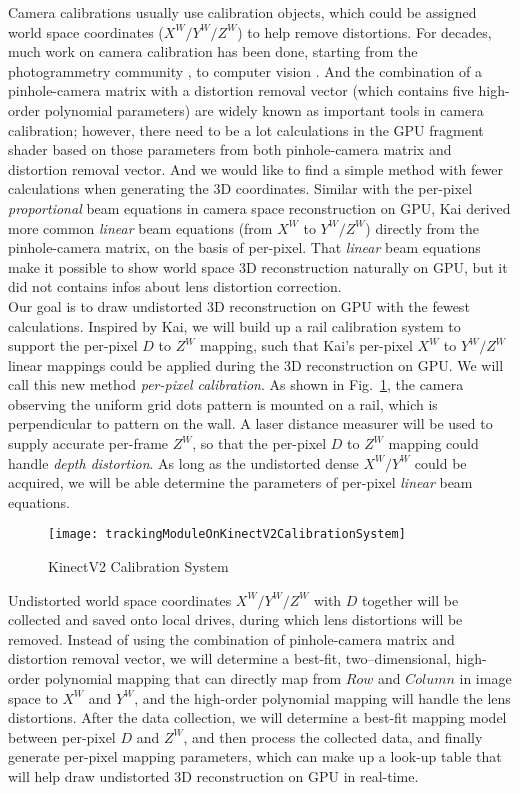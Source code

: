 Camera calibrations usually use calibration objects, which could be assigned world space coordinates (\(X^W/Y^W/Z^W\)) to help remove distortions. For decades, much work on camera calibration has been done, starting from the photogrammetry community \cite{photogrammetry01_1971, photogrammetry02_1975}, to computer vision \cite{Tsai1987, treeDcalibration1_1993, Zhengyou04}. And the combination of a pinhole-camera matrix with a distortion removal vector (which contains five high-order polynomial parameters) are widely known as important tools in camera calibration; however, there need to be a lot calculations in the GPU fragment shader based on those parameters from both pinhole-camera matrix and distortion removal vector. And we would like to find a simple method with fewer calculations when generating the 3D coordinates. Similar with the per-pixel \emph{proportional} beam equations in camera space reconstruction on GPU, Kai \cite{Kai10} derived more common \emph{linear} beam equations (from \(X^W\) to \(Y^W/Z^W\)) directly from the pinhole-camera matrix, on the basis of per-pixel. That \emph{linear} beam equations make it possible to show world space 3D reconstruction naturally on GPU, but it did not contains infos about lens distortion correction. 
\\\indent
%
Our goal is to draw undistorted 3D reconstruction on GPU with the fewest calculations. Inspired by Kai, we will build up a rail calibration system to support the per-pixel \(D\) to \(Z^W\) mapping, such that Kai's per-pixel \(X^W\) to \(Y^W/Z^W\) linear mappings could be applied during the 3D reconstruction on GPU. We will call this new method \textit{per-pixel calibration}. As shown in Fig.~\ref{trackingModuleOnKinectV2CalibrationSystem}, the camera observing the uniform grid dots pattern is mounted on a rail, which is perpendicular to pattern on the wall. A laser distance measurer will be used to supply accurate per-frame \(Z^W\), so that the per-pixel \(D\) to \(Z^W\) mapping could handle \emph{depth distortion}. As long as the undistorted dense \(X^W/Y^W\) could be acquired, we will be able determine the parameters of per-pixel \emph{linear} beam equations.
\\\indent
\begin{figure}[t]
\centering
\texttt{[image: trackingModuleOnKinectV2CalibrationSystem]}
\caption{KinectV2 Calibration System}
\label{trackingModuleOnKinectV2CalibrationSystem}
\end{figure}%
Undistorted world space coordinates \(X^W/Y^W/Z^W\) with \(D\) together will be collected and saved onto local drives, during which lens distortions will be removed. Instead of using the combination of pinhole-camera matrix and distortion removal vector, we will determine a best-fit, two--dimensional, high-order polynomial mapping that can directly map from \(Row\) and \(Column\) in image space to \(X^W\) and \(Y^W\), and the high-order polynomial mapping will handle the lens distortions. After the data collection, we will determine a best-fit mapping model between per-pixel \(D\) and \(Z^W\), and then process the collected data, and finally generate per-pixel mapping parameters, which can make up a look-up table that will help draw undistorted 3D reconstruction on GPU in real-time.
